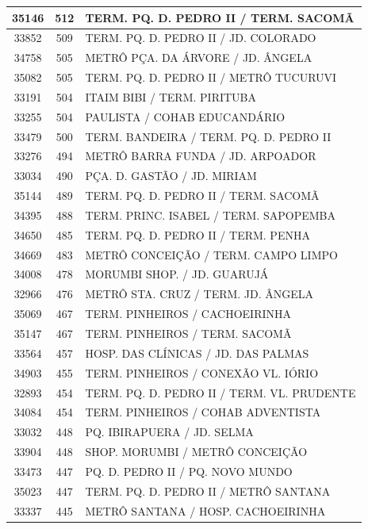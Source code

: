 \documentclass[
	12pt,				%
	oneside,			%
	a4paper,			%
	english,			%
	brazil				%
	]{abntex2ppgsi}
\begin{document}
{{\begin{apendicesenv}
\begin{longtable}{c|c|p{7cm}}
35146 &	512 &	TERM. PQ. D. PEDRO II / TERM. SACOMÃ \\ 
 \hline 
33852 &	509 &	TERM. PQ. D. PEDRO II / JD. COLORADO \\ 
 \hline 
34758 &	505 &	METRÔ PÇA. DA ÁRVORE / JD. ÂNGELA \\ 
 \hline 
35082 &	505 &	TERM. PQ. D. PEDRO II / METRÔ TUCURUVI \\ 
 \hline 
33191 &	504 &	ITAIM BIBI / TERM. PIRITUBA \\ 
 \hline 
33255 &	504 &	PAULISTA / COHAB EDUCANDÁRIO \\ 
 \hline 
33479 &	500 &	TERM. BANDEIRA / TERM. PQ. D. PEDRO II \\ 
 \hline 
33276 &	494 &	METRÔ BARRA FUNDA / JD. ARPOADOR \\ 
 \hline 
33034 &	490 &	PÇA. D. GASTÃO / JD. MIRIAM \\ 
 \hline 
35144 &	489 &	TERM. PQ. D. PEDRO II / TERM. SACOMÃ \\ 
 \hline 
34395 &	488 &	TERM. PRINC. ISABEL / TERM. SAPOPEMBA \\ 
 \hline 
34650 &	485 &	TERM. PQ. D. PEDRO II / TERM. PENHA \\ 
 \hline 
34669 &	483 &	METRÔ CONCEIÇÃO / TERM. CAMPO LIMPO \\ 
 \hline 
34008 &	478 &	MORUMBI SHOP. / JD. GUARUJÁ \\ 
 \hline 
32966 &	476 &	METRÔ STA. CRUZ / TERM. JD. ÂNGELA \\ 
 \hline 
35069 &	467 &	TERM. PINHEIROS / CACHOEIRINHA \\ 
 \hline 
35147 &	467 &	TERM. PINHEIROS / TERM. SACOMÃ \\ 
 \hline 
33564 &	457 &	HOSP. DAS CLÍNICAS / JD. DAS PALMAS \\ 
 \hline 
34903 &	455 &	TERM. PINHEIROS / CONEXÃO VL. IÓRIO \\ 
 \hline 
32893 &	454 &	TERM. PQ. D. PEDRO II / TERM. VL. PRUDENTE \\ 
 \hline 
34084 &	454 &	TERM. PINHEIROS / COHAB ADVENTISTA \\ 
 \hline 
33032 &	448 &	PQ. IBIRAPUERA / JD. SELMA \\ 
 \hline 
33904 &	448 &	SHOP. MORUMBI / METRÔ CONCEIÇÃO \\ 
 \hline 
33473 &	447 &	PQ. D. PEDRO II / PQ. NOVO MUNDO \\ 
 \hline 
35023 &	447 &	TERM. PQ. D. PEDRO II / METRÔ SANTANA \\ 
 \hline 
33337 &	445 &	METRÔ SANTANA / HOSP. CACHOEIRINHA \\ 

\end{longtable}
\end{apendicesenv}}}
\end{document}
